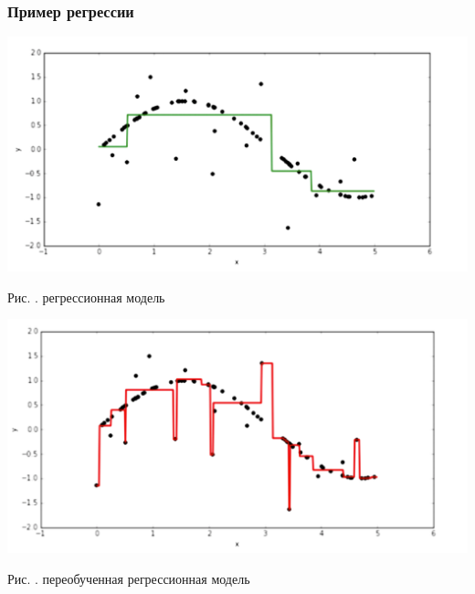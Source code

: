 \documentclass[pdf, 9pt, usenames, dvipsnames, unicode, hyperref={bookmarks=true,bookmarksopen=false, bookmarksnumbered}]{beamer}
\begin{document}
\begin{frame}\frametitle{Пример регрессии}

    \begin{center}
    \includegraphics[scale=0.2]{pic31.png}{ \\ }
    \end{center}
    
    \begin{center}
	Рис. . регрессионная модель
    \end{center}
    
    \begin{center}
    \includegraphics[scale=0.2]{pic32.png}{ \\ }
    \end{center}
    
    \begin{center}
	Рис. . переобученная регрессионная модель
    \end{center}


\end{frame}

\end{document}
